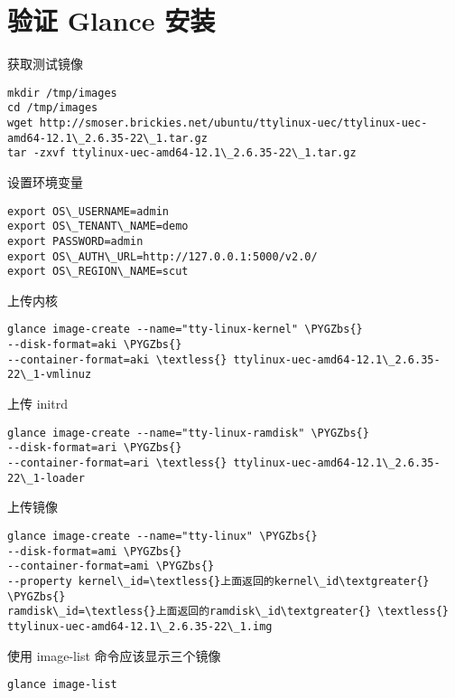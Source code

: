 \documentclass[letterpaper,10pt,english]{sphinxmanual}
\def\PYGZbs{\char`\\}
\begin{document}
\section{验证 Glance 安装}
\label{glance:id5}
获取测试镜像

\begin{Verbatim}[commandchars=\\\{\}]
mkdir /tmp/images
cd /tmp/images
wget http://smoser.brickies.net/ubuntu/ttylinux-uec/ttylinux-uec-amd64-12.1\_2.6.35-22\_1.tar.gz
tar -zxvf ttylinux-uec-amd64-12.1\_2.6.35-22\_1.tar.gz
\end{Verbatim}

设置环境变量

\begin{Verbatim}[commandchars=\\\{\}]
export OS\_USERNAME=admin
export OS\_TENANT\_NAME=demo
export PASSWORD=admin
export OS\_AUTH\_URL=http://127.0.0.1:5000/v2.0/
export OS\_REGION\_NAME=scut
\end{Verbatim}

上传内核

\begin{Verbatim}[commandchars=\\\{\}]
glance image-create --name="tty-linux-kernel" \PYGZbs{}
--disk-format=aki \PYGZbs{}
--container-format=aki \textless{} ttylinux-uec-amd64-12.1\_2.6.35-22\_1-vmlinuz
\end{Verbatim}

上传 initrd

\begin{Verbatim}[commandchars=\\\{\}]
glance image-create --name="tty-linux-ramdisk" \PYGZbs{}
--disk-format=ari \PYGZbs{}
--container-format=ari \textless{} ttylinux-uec-amd64-12.1\_2.6.35-22\_1-loader
\end{Verbatim}

上传镜像

\begin{Verbatim}[commandchars=\\\{\}]
glance image-create --name="tty-linux" \PYGZbs{}
--disk-format=ami \PYGZbs{}
--container-format=ami \PYGZbs{}
--property kernel\_id=\textless{}上面返回的kernel\_id\textgreater{} \PYGZbs{}
ramdisk\_id=\textless{}上面返回的ramdisk\_id\textgreater{} \textless{} ttylinux-uec-amd64-12.1\_2.6.35-22\_1.img
\end{Verbatim}

使用 image-list 命令应该显示三个镜像

\begin{Verbatim}[commandchars=\\\{\}]
glance image-list
\end{Verbatim}
\end{document}
